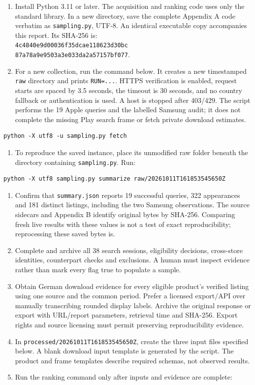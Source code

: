 \documentclass[10pt,a4paper]{article}
\begin{document}
\begin{enumerate}
\item Install Python 3.11 or later. The acquisition and ranking code uses only
the standard library. In a new directory, save the complete Appendix A code
verbatim as \texttt{sampling.py}, UTF-8. An identical executable copy accompanies
this report. Its SHA-256 is:\\
\texttt{4c4840e9d00036f35dcae118623d30bc}\\\texttt{87a78a9e9503a3e033da2a57157bf077}.
\item For a new collection, run the command below. It creates a new timestamped
\texttt{raw} directory and prints \texttt{RUN=...}. HTTPS verification is enabled,
request starts are spaced by 3.5 seconds, the timeout is 30 seconds, and no
country fallback or authentication is used. A host is stopped after 403/429.
The script performs the 19 Apple queries and the labelled Samsung audit; it does
not complete the missing Play search frame or fetch private download estimates.
\end{enumerate}
\begin{lstlisting}[language={}]
python -X utf8 -u sampling.py fetch
\end{lstlisting}
\begin{enumerate}[resume]
\item To reproduce the saved instance, place its unmodified raw folder beneath
the directory containing \texttt{sampling.py}. Run:
\end{enumerate}
\begin{lstlisting}[language={}]
python -X utf8 sampling.py summarize raw/20261011T161853545650Z
\end{lstlisting}
\begin{enumerate}[resume]
\item Confirm that \texttt{summary.json} reports 19 successful queries, 322
appearances and 181 distinct listings, including the two Samsung observations.
The source sidecars and Appendix B identify original bytes by SHA-256. Comparing
fresh live results with these values is not a test of exact reproducibility;
reprocessing these saved bytes is.
\item Complete and archive all 38 search sessions, eligibility decisions,
cross-store identities, counterpart checks and exclusions. A human must inspect
evidence rather than mark every flag true to populate a sample.
\item Obtain German download evidence for every eligible product's verified
listing using one source and the common period. Prefer a licensed export/API over
manually transcribing rounded display labels. Archive the original response or
export with URL/report parameters, retrieval time and SHA-256. Export rights and
source licensing must permit preserving reproducibility evidence.
\item In \texttt{processed/20261011T161853545650Z}, create the three input files
specified below. A blank download input template is generated by the script.
The product and frame templates describe required schemas, not observed results.
\item Run the ranking command only after inputs and evidence are complete:
\end{enumerate}
\end{document}
